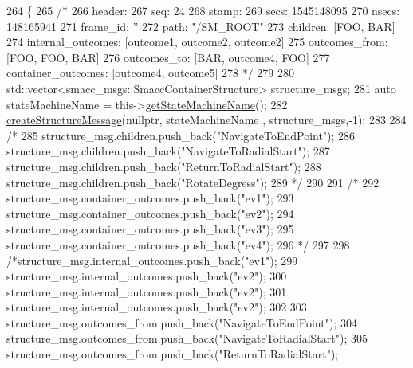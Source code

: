 \begin{DoxyCode}
264     \{
265     \textcolor{comment}{/*}
266 \textcolor{comment}{    header: }
267 \textcolor{comment}{    seq: 24}
268 \textcolor{comment}{    stamp: }
269 \textcolor{comment}{        secs: 1545148095}
270 \textcolor{comment}{        nsecs: 148165941}
271 \textcolor{comment}{    frame\_id: ''}
272 \textcolor{comment}{    path: "/SM\_ROOT"}
273 \textcolor{comment}{    children: [FOO, BAR]}
274 \textcolor{comment}{    internal\_outcomes: [outcome1, outcome2, outcome2]}
275 \textcolor{comment}{    outcomes\_from: [FOO, FOO, BAR]}
276 \textcolor{comment}{    outcomes\_to: [BAR, outcome4, FOO]}
277 \textcolor{comment}{    container\_outcomes: [outcome4, outcome5]}
278 \textcolor{comment}{    */}
279 
280     std::vector<smacc\_msgs::SmaccContainerStructure> structure\_msgs;
281     \textcolor{keyword}{auto} stateMachineName = this->\hyperlink{classsmacc_1_1ISmaccStateMachine_a2d0b1742f17dd77d5df217153e8b5259}{getStateMachineName}();
282     \hyperlink{structsmacc_1_1SmaccStateMachineBase_a060a552dce399a974a8e68d498fdfb6b}{createStructureMessage}(\textcolor{keyword}{nullptr}, stateMachineName , structure\_msgs,-1);
283 
284     \textcolor{comment}{/*}
285 \textcolor{comment}{    structure\_msg.children.push\_back("NavigateToEndPoint");}
286 \textcolor{comment}{    structure\_msg.children.push\_back("NavigateToRadialStart");}
287 \textcolor{comment}{    structure\_msg.children.push\_back("ReturnToRadialStart");}
288 \textcolor{comment}{    structure\_msg.children.push\_back("RotateDegress");         }
289 \textcolor{comment}{    */}
290 
291     \textcolor{comment}{/*}
292 \textcolor{comment}{    structure\_msg.container\_outcomes.push\_back("ev1");}
293 \textcolor{comment}{    structure\_msg.container\_outcomes.push\_back("ev2");}
294 \textcolor{comment}{    structure\_msg.container\_outcomes.push\_back("ev3");}
295 \textcolor{comment}{    structure\_msg.container\_outcomes.push\_back("ev4");}
296 \textcolor{comment}{    */}
297     
298     \textcolor{comment}{/*structure\_msg.internal\_outcomes.push\_back("ev1");}
299 \textcolor{comment}{    structure\_msg.internal\_outcomes.push\_back("ev2");}
300 \textcolor{comment}{    structure\_msg.internal\_outcomes.push\_back("ev2");}
301 \textcolor{comment}{    structure\_msg.internal\_outcomes.push\_back("ev2");}
302 \textcolor{comment}{}
303 \textcolor{comment}{    structure\_msg.outcomes\_from.push\_back("NavigateToEndPoint");}
304 \textcolor{comment}{    structure\_msg.outcomes\_from.push\_back("NavigateToRadialStart");}
305 \textcolor{comment}{    structure\_msg.outcomes\_from.push\_back("ReturnToRadialStart");}

\end{DoxyCode}
